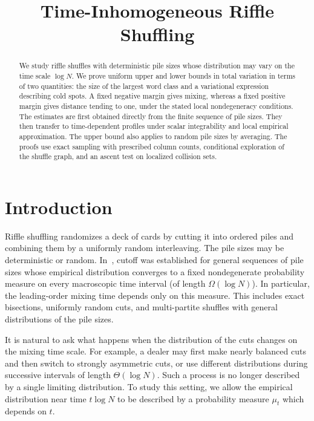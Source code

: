 \documentclass[11pt]{article}
\title{Time-Inhomogeneous Riffle Shuffling}
\author{}
\date{}
\makeatletter
\numberwithin{equation}{section}
\theoremstyle{definition}
\theoremstyle{remark}
\newcommand{\1}{\mathbf 1}
\renewcommand{\maketitle}{\begin{center}{\LARGE\@title\par}\end{center}\vspace{1em}}
\makeatother
\begin{document}
\maketitle
\begin{abstract}
We study riffle shuffles with deterministic pile sizes whose distribution may
vary on the time scale $\log N$. We prove uniform upper and lower bounds in
total variation in terms of two quantities: the size of the largest word
class and a variational expression describing cold spots. A fixed negative
margin gives mixing, whereas a fixed positive margin gives distance tending
to one, under the stated local nondegeneracy conditions. The estimates are
first obtained directly from the finite sequence of pile sizes. They then
transfer to time-dependent profiles under scalar integrability and local
empirical approximation. The upper bound also applies to random pile sizes
by averaging. The proofs use exact sampling with prescribed column counts,
conditional exploration of the shuffle graph, and an ascent test on
localized collision sets.
\end{abstract}

\section{Introduction}

Riffle shuffling randomizes a deck of cards by cutting it into ordered
piles and combining them by a uniformly random interleaving. The pile
sizes may be deterministic or random. In~\cite{SSW}, cutoff was established
for general sequences of pile sizes whose empirical distribution converges
to a fixed nondegenerate probability measure on every macroscopic time
interval (of length $\Omega(\log N)$). In particular, the leading-order mixing time
depends only on this measure. This includes exact bisections, uniformly
random cuts, and multi-partite shuffles with general distributions of the
pile sizes.

It is natural to ask what happens when the distribution of the cuts
changes on the mixing time scale. For example, a dealer may first make
nearly balanced cuts and then switch to strongly asymmetric cuts, or use
different distributions during successive intervals of length
$\Theta(\log N)$. Such a process is no longer described by a single
limiting distribution. To study this setting, we allow the empirical
distribution near time $t\log N$ to be described by a probability measure
$\mu_t$ which depends on $t$.
\end{document}
